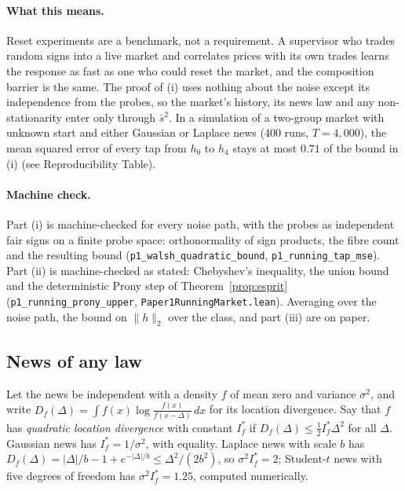 \documentclass[12pt]{article}
\theoremstyle{definition}
\theoremstyle{remark}
\begin{document}
\paragraph{What this means.} Reset experiments are a benchmark, not a requirement. A supervisor who trades random signs into a live market and correlates prices with its own trades learns the response as fast as one who could reset the market, and the composition barrier is the same. The proof of (i) uses nothing about the noise except its independence from the probes, so the market's history, its news law and any non-stationarity enter only through $\bar s^2$. In a simulation of a two-group market with unknown start and either Gaussian or Laplace news (400 runs, $T=4{,}000$), the mean squared error of every tap from $h_0$ to $h_4$ stays at most $0.71$ of the bound in (i) (see Reproducibility Table).

\paragraph{Machine check.} Part (i) is machine-checked for every noise path, with the probes as independent fair signs on a finite probe space: orthonormality of sign products, the fibre count and the resulting bound (\texttt{p1\_walsh\_quadratic\_bound}, \texttt{p1\_running\_tap\_mse}). Part (ii) is machine-checked as stated: Chebyshev's inequality, the union bound and the deterministic Prony step of Theorem~\ref{prop:esprit} (\texttt{p1\_running\_prony\_upper}, \nolinkurl{Paper1RunningMarket.lean}). Averaging over the noise path, the bound on $\|h\|_2$ over the class, and part (iii) are on paper.

\subsection{News of any law}

Let the news be independent with a density $f$ of mean zero and variance $\sigma^2$, and write $D_f(\Delta)=\int f(x)\log\frac{f(x)}{f(x-\Delta)}\,dx$ for its location divergence. Say that $f$ has \emph{quadratic location divergence} with constant $I^*_f$ if $D_f(\Delta)\le\frac12I^*_f\Delta^2$ for all $\Delta$. Gaussian news has $I^*_f=1/\sigma^2$, with equality. Laplace news with scale $b$ has $D_f(\Delta)=|\Delta|/b-1+e^{-|\Delta|/b}\le\Delta^2/(2b^2)$, so $\sigma^2I^*_f=2$; Student-$t$ news with five degrees of freedom has $\sigma^2I^*_f=1.25$, computed numerically.
\end{document}
